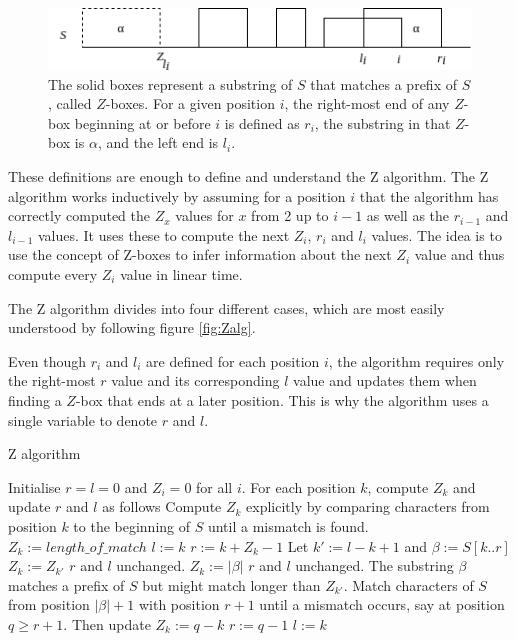 \begin{figure}[t]
    \centering
    \includegraphics[width=.9\textwidth]{LaTeX/Figures/Zalg/zboxes.png}
    \caption{The solid boxes represent a substring of $S$ that matches a prefix of $S$, called $Z$-boxes. For a given position $i$, the right-most end of any $Z$-box beginning at or before $i$ is defined as $r_i$, the substring in that $Z$-box is $\alpha$, and the left end is $l_i$. }
    \label{fig:z_boxes}
\end{figure}

These definitions are enough to define and understand the Z algorithm. The Z algorithm works inductively by assuming for a position $i$ that the algorithm has correctly computed the $Z_x$ values for $x$ from 2 up to $i-1$ as well as the $r_{i-1}$ and $l_{i-1}$ values. It uses these to compute the next $Z_i$, $r_i$ and $l_i$ values. The idea is to use the concept of Z-boxes to infer information about the next $Z_i$ value and thus compute every $Z_i$ value in linear time. 

The Z algorithm divides into four different cases, which are most easily understood by following figure \ref{fig:Zalg}. 

Even though $r_i$ and $l_i$ are defined for each position $i$, the algorithm requires only the right-most $r$ value and its corresponding $l$ value and updates them when finding a $Z$-box that ends at a later position. This is why the algorithm uses a single variable to denote $r$ and $l$. 

\begin{algorithm}
\caption{Z algorithm}\label{alg:z_alg}
\begin{algorithmic}
\State Initialise $r=l=0$ and $Z_i=0$ for all $i$. 
\State For each position $k$, compute $Z_k$ and update $r$ and $l$ as follows
 
    \State Compute $Z_k$ explicitly by comparing characters from position $k$ to the \State beginning of $S$ until a mismatch is found. 
    \State $Z_k:=length\_of\_match$
    \State $l:=k$
    \State $r:=k+Z_k-1$
    \State Let $k':=l-k+1$ and $\beta:=S[k..r]$
     
        \State $Z_k:=Z_{k'}$
        \State $r$ and $l$ unchanged. 
     
        \State $Z_k:=|\beta|$
        \State $r$ and $l$ unchanged. 
     
        \State The substring $\beta$ matches a prefix of $S$ but might match longer than $Z_{k'}$. \State Match characters of $S$ from position $|\beta|+1$ with position $r+1$ until a \State mismatch occurs, say at position $q\geq r+1$. Then update
        \State $Z_k:=q-k$
        \State $r:=q-1$
        \State $l:=k$
    \EndIf
\EndIf
\EndFor
\end{algorithmic}
\end{algorithm}


